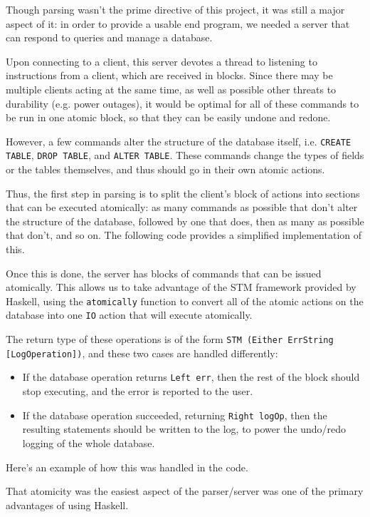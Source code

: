 
Though parsing wasn't the prime directive of this project, it was still a major aspect of it: in order to provide a usable end program, we needed a server that can respond to queries and manage a database.

Upon connecting to a client, this server devotes a thread to listening to instructions from a client, which are received in blocks. Since there may be multiple clients acting at the same time, as well as possible other threats to durability (e.g. power outages), it would be optimal for all of these commands to be run in one atomic block, so that they can be easily undone and redone.

However, a few commands alter the structure of the database itself, i.e. \verb+CREATE TABLE+, \verb+DROP TABLE+, and \verb+ALTER TABLE+. These commands change the types of fields or the tables themselves, and thus should go in their own atomic actions.

Thus, the first step in parsing is to split the client's block of actions into sections that can be executed atomically: as many commands as possible that don't alter the structure of the database, followed by one that does, then as many as possible that don't, and so on. The following code provides a simplified implementation of this.

Once this is done, the server has blocks of commands that can be issued atomically. This allows us to take advantage of the STM framework provided by Haskell, using the \verb+atomically+ function to convert all of the atomic actions on the database into one \verb+IO+ action that will execute atomically.

The return type of these operations is of the form \verb+STM (Either ErrString [LogOperation])+, and these two cases are handled differently:
\begin{itemize}
	\item If the database operation returns \verb+Left err+, then the rest of the block should stop executing, and the error is reported to the user.
	\item If the database operation succeeded, returning \verb+Right logOp+, then the resulting statements should be written to the log, to power the undo/redo logging of the whole database.
\end{itemize}
Here's an example of how this was handled in the code.

That atomicity was the easiest aspect of the parser/server was one of the primary advantages of using Haskell.

